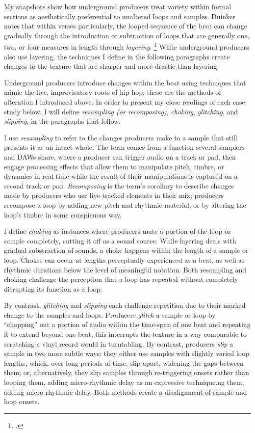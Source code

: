 My snapshots show how underground producers treat variety within formal sections as 
aesthetically preferential to unaltered loops and samples. Duinker notes that within verses 
particularly, the looped sequence of the beat can change gradually through the introduction
or subtraction of loops that are generally one, two, or four measures in length through
\emph{layering}. \footnote{
    \cite[96]{benduinkerSongFormMainstreaming2020}.} 
While underground producers also use layering, the techniques I define in the following
paragraphs create changes to the texture that are sharper and more drastic than layering.

Underground producers introduce changes within the beat using techniques that mimic the 
live, improvisatory roots of hip-hop; these are the methods of alteration I introduced 
above.  In order to present my close readings of each case study below, I will define 
\emph{resampling (or recomposing)}, \emph{choking}, \emph{glitching}, and \emph{slipping}, 
in the paragraphs that follow.

I use \emph{resampling} to refer to the changes producers make to a sample that still presents it 
as an intact whole. The term comes from a function several samplers and DAWs share, where a producer
can trigger audio on a track or pad, then engage processing effects that allow them to manipulate 
pitch, timbre, or dynamics in real time while the result of their manipulations is captured on a
second track or pad. \textit{Recomposing} is the term's corollary to describe changes made by
producers who use live-tracked elements in their mix; producers recompose a loop by adding new
pitch and rhythmic material, or by altering the loop's timbre in some conspicuous way.

I define \emph{choking} as instances where producers mute a portion of the loop or sample
completely, cutting it off as a sound source. While layering deals with gradual substraction
of sounds, a choke happens within the length of a sample or loop. Chokes can occur at lengths
perceptually experienced as a beat, as well as rhythmic durations below the level of meaningful
notation. Both resampling and choking challenge the perception that a loop has repeated without
completely disrupting its function as a loop.

\label{glitch}
By contrast, \emph{glitching} and \emph{slipping} each challenge repetition due to their marked 
change to the samples and loops. Producers \emph{glitch} a sample or loop by ``chopping'' out
a portion of audio within the time-span of one beat and repeating it to extend beyond one beat; 
this interrupts the texture in a way comparable to scratching a vinyl record would in turntabling. 
By contrast, producers \emph{slip} a sample in two more subtle ways: they either use samples with
slightly varied loop lengths, which, over long periods of time, slip apart, widening the gaps
between them; or, alternatively, they slip samples through re-triggering onsets rather than
looping them, adding micro-rhythmic delay as an expressive technique.ng them, adding micro-rhythmic 
delay. Both methods create a disalignment of sample and loop onsets.

